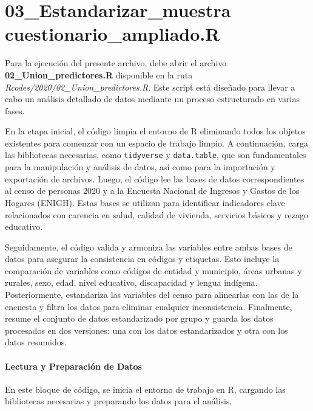\documentclass[
  12pt,
]{book}
\begin{document}
\hypertarget{estandarizar_muestra-cuestionario_ampliado.r}{%
\chapter*{03\_Estandarizar\_muestra cuestionario\_ampliado.R}\label{estandarizar_muestra-cuestionario_ampliado.r}}

Para la ejecución del presente archivo, debe abrir el archivo \textbf{02\_Union\_predictores.R} disponible en la ruta \emph{Rcodes/2020/02\_Union\_predictores.R}. Este script está diseñado para llevar a cabo un análisis detallado de datos mediante un proceso estructurado en varias fases.

En la etapa inicial, el código limpia el entorno de R eliminando todos los objetos existentes para comenzar con un espacio de trabajo limpio. A continuación, carga las bibliotecas necesarias, como \texttt{tidyverse} y \texttt{data.table}, que son fundamentales para la manipulación y análisis de datos, así como para la importación y exportación de archivos. Luego, el código lee las bases de datos correspondientes al censo de personas 2020 y a la Encuesta Nacional de Ingresos y Gastos de los Hogares (ENIGH). Estas bases se utilizan para identificar indicadores clave relacionados con carencia en salud, calidad de vivienda, servicios básicos y rezago educativo.

Seguidamente, el código valida y armoniza las variables entre ambas bases de datos para asegurar la consistencia en códigos y etiquetas. Esto incluye la comparación de variables como códigos de entidad y municipio, áreas urbanas y rurales, sexo, edad, nivel educativo, discapacidad y lengua indígena. Posteriormente, estandariza las variables del censo para alinearlas con las de la encuesta y filtra los datos para eliminar cualquier inconsistencia. Finalmente, resume el conjunto de datos estandarizado por grupo y guarda los datos procesados en dos versiones: una con los datos estandarizados y otra con los datos resumidos.

\hypertarget{lectura-y-preparaciuxf3n-de-datos}{%
\subsubsection*{Lectura y Preparación de Datos}\label{lectura-y-preparaciuxf3n-de-datos}}

En este bloque de código, se inicia el entorno de trabajo en R, cargando las bibliotecas necesarias y preparando los datos para el análisis.
\end{document}
